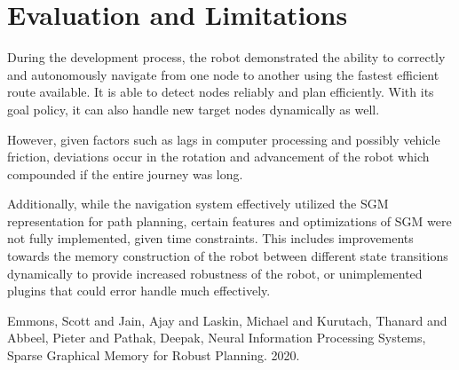 \documentclass[conference]{IEEEtran}
\begin{document}
\section{Evaluation and Limitations}
During the development process, the robot demonstrated the ability to correctly and autonomously navigate from one node to another using the fastest efficient route available. It is able to detect nodes reliably and plan efficiently. With its goal policy, it can also handle new target nodes dynamically as well.

However, given factors such as lags in computer processing and possibly vehicle friction, deviations occur in the rotation and advancement of the robot which compounded if the entire journey was long.

Additionally, while the navigation system effectively utilized the SGM representation for path planning, certain features and optimizations of SGM were not fully implemented, given time constraints. This includes improvements towards the memory construction of the robot between different state transitions dynamically to provide increased robustness of the robot, or unimplemented plugins that could error handle much effectively.

\begin{thebibliography}{00}
   Emmons, Scott and Jain, Ajay and   Laskin, Michael and Kurutach, Thanard   and Abbeel, Pieter and Pathak, Deepak, Neural Information Processing Systems, Sparse Graphical Memory for Robust Planning. 2020.

\end{thebibliography}
\end{document}
